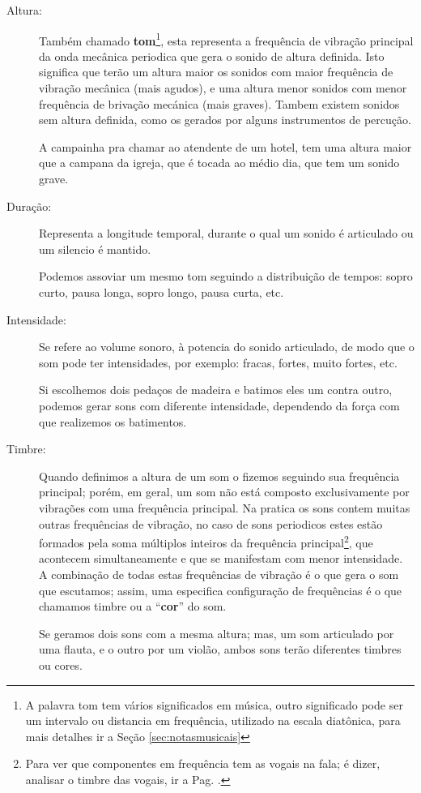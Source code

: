\begin{description}
\item [Altura:] \label{sec:pos:Altura} 
Também chamado \textbf{tom}\footnote{A palavra tom tem vários significados em música, 
outro significado pode ser um intervalo ou distancia em frequência, 
utilizado na escala diatônica, para mais detalhes ir a Seção \ref{sec:notasmusicais}}, 
esta representa a frequência de vibração principal da onda 
mecânica periodica que gera o sonido de altura definida.
Isto significa que terão um altura maior os sonidos com maior frequência de vibração mecânica (mais agudos), 
e uma altura menor sonidos com menor frequência de brivação mecánica (mais graves).
Tambem existem sonidos sem altura definida, como os gerados por alguns instrumentos de percução.
\begin{example}
A campainha pra chamar ao atendente de um hotel, 
tem uma altura maior que a campana da igreja, 
que é tocada ao médio dia, que tem um sonido grave.
\end{example} 
\item [Duração:] \label{sec:pos:Duracion}
Representa a longitude temporal, 
durante o qual um sonido é articulado ou um silencio é mantido.
\begin{example}
Podemos assoviar um mesmo tom seguindo a distribuição de tempos: 
sopro curto, pausa longa, sopro longo, pausa curta, etc.
\end{example} 
\item [Intensidade:] \label{sec:pos:Intensidade}
Se refere ao volume sonoro, à potencia do sonido articulado, 
de modo que o som pode ter intensidades, por exemplo: fracas, fortes, muito fortes, etc.  
\begin{example}
Si escolhemos dois pedaços de madeira e batimos eles um contra outro, 
podemos gerar sons com diferente intensidade, dependendo da força com que realizemos os batimentos.
\end{example} 
\item [Timbre:] \label{sec:pos:timbre}
Quando definimos a altura de um som o fizemos seguindo sua frequência principal;
porém, em geral, um som não está composto exclusivamente por vibrações com uma frequência principal.
Na pratica os sons contem muitas outras frequências de vibração,
no caso de sons periodicos estes estão formados pela soma 
múltiplos inteiros da frequência principal\footnote{Para 
ver que componentes em frequência tem as vogais na fala;
é dizer, analisar o timbre das vogais, ir a Pag. \pageref{fig:timbresvocais}.}, 
que acontecem simultaneamente e 
que se manifestam com menor intensidade.
A combinação de todas estas frequências de vibração é o que gera o som que escutamos;
assim, uma especifica configuração de frequências é o que chamamos timbre ou
a ``\textbf{cor}'' do som.
\begin{example}
Se geramos dois sons com a mesma altura; mas, um som articulado por uma flauta,
e o outro por um violão, ambos sons terão diferentes timbres ou cores.
\end{example} 
\end{description}
